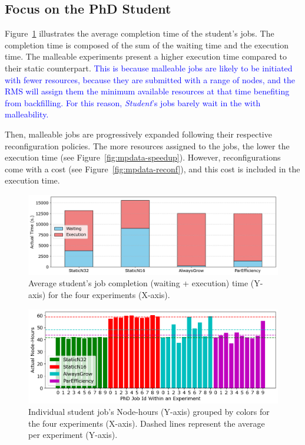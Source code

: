 \documentclass[a4paper,fleqn]{cas-dc}
\newcommand{\review}[1]{\textcolor{blue}{#1}}
\begin{document}
\subsection{Focus on the PhD Student}
Figure~\ref{fig:phd_completion} illustrates the average completion time of the student's jobs.
The completion time is composed of the sum of the waiting time and the execution time. 
The malleable experiments present a higher execution time compared to their static counterpart.
\review{
This is because malleable jobs are likely to be initiated with fewer resources, because they are submitted with a range of nodes, and the RMS will assign them the minimum available resources at that time benefiting from backfilling.
For this reason, \textit{Student}'s jobs barely wait in the with malleability.
}

Then, malleable jobs are progressively expanded following their respective reconfiguration policies.
The more resources assigned to the jobs, the lower the execution time (see Figure~\ref{fig:mpdata-speedup}). 
However, reconfigurations come with a cost (see Figure~\ref{fig:mpdata-reconf}), and this cost is included in the execution time.

\begin{figure}[tbp]
    \centering
        \includegraphics[clip,width=0.95\linewidth,trim={0.1cm 0.1cm 0.1cm 0.1cm}]{figures/phd-stacked.png}
        \caption{Average student's job completion (waiting + execution) time (Y-axis) for the four experiments (X-axis).}
        \label{fig:phd_completion}
\end{figure}

\begin{figure}[tbp]
    \centering
        \includegraphics[clip,width=0.95\linewidth,trim={0.2cm 0.1cm 0.2cm 0.1cm}]{figures/node-hours3.png}
        \caption{Individual student job's Node-hours (Y-axis) grouped by colors for the four experiments (X-axis). Dashed lines represent the average per experiment (Y-axis).}
        \label{fig:phd_nodehours}
\end{figure}
\end{document}
